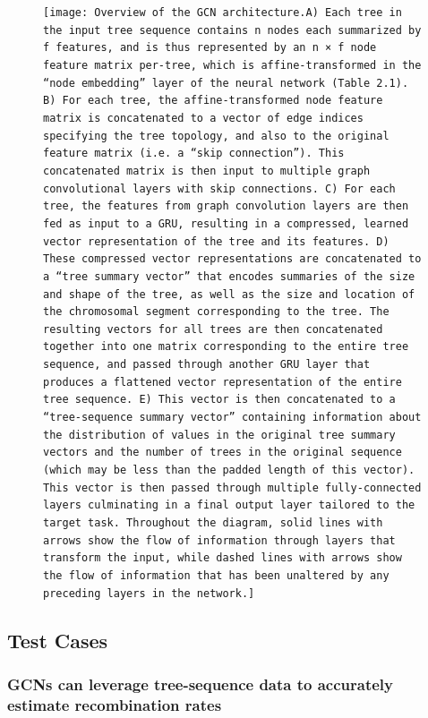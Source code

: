 \begin{figure}
    \centering
    \texttt{[image: Overview of the GCN architecture.A) Each tree in the input tree sequence contains n nodes each summarized by f features, and is thus represented by an n × f node feature matrix per-tree, which is affine-transformed in the “node embedding” layer of the neural network (Table 2.1). B) For each tree, the affine-transformed node feature matrix is concatenated to a vector of edge indices specifying the tree topology, and also to the original feature matrix (i.e. a “skip connection”). This concatenated matrix is then input to multiple graph convolutional layers with skip connections. C) For each tree, the features from graph convolution layers are then fed as input to a GRU, resulting in a compressed, learned vector representation of the tree and its features. D) These compressed vector representations are concatenated to a “tree summary vector” that encodes summaries of the size and shape of the tree, as well as the size and location of the chromosomal segment corresponding to the tree. The resulting vectors for all trees are then concatenated together into one matrix corresponding to the entire tree sequence, and passed through another GRU layer that produces a flattened vector representation of the entire tree sequence. E) This vector is then concatenated to a “tree-sequence summary vector” containing information about the distribution of values in the original tree summary vectors and the number of trees in the original sequence (which may be less than the padded length of this vector). This vector is then passed through multiple fully-connected layers culminating in a final output layer tailored to the target task. Throughout the diagram, solid lines with arrows show the flow of information through layers that transform the input, while dashed lines with arrows show the flow of information that has been unaltered by any preceding layers in the network.]}
    \label{fig:enter-label}
\end{figure}



\subsection{Test Cases}
\subsubsection{GCNs can leverage tree-sequence data to accurately estimate recombination rates}

